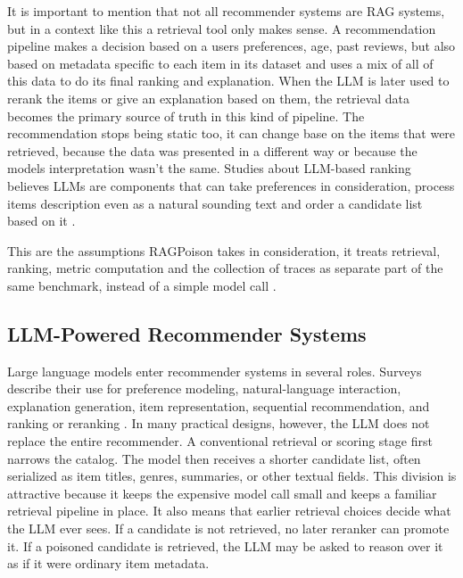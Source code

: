 It is important to mention that not all recommender systems are RAG systems, but in a context like this a retrieval tool only makes sense. A recommendation pipeline makes a decision based on a users preferences, age, past reviews, but also based on metadata specific to each item in its dataset and uses a mix of all of this data to do its final ranking and explanation. When the LLM is later used to rerank the items or give an explanation based on them, the retrieval data becomes the primary source of truth in this kind of pipeline. The recommendation stops being static too, it can change base on the items that were retrieved, because the data was presented in a different way or because the models interpretation wasn't the same. Studies about LLM-based ranking believes LLMs are components that can take preferences in consideration, process items description even as a natural sounding text and order a candidate list based on it \cite{wu2024llmrecsurvey,zhao2024llmrecsystems,hou2024llmrankers,sun2024rankgpt}.

This are the assumptions RAGPoison takes in consideration, it treats retrieval, ranking, metric computation and the collection of traces as separate part of the same benchmark, instead of a simple model call \cite{ragpoisonlab_repo}. 

\subsection{LLM-Powered Recommender Systems}

Large language models enter recommender systems in several roles. Surveys describe their use for preference modeling, natural-language interaction, explanation generation, item representation, sequential recommendation, and ranking or reranking \cite{wu2024llmrecsurvey,zhao2024llmrecsystems}. In many practical designs, however, the LLM does not replace the entire recommender. A conventional retrieval or scoring stage first narrows the catalog. The model then receives a shorter candidate list, often serialized as item titles, genres, summaries, or other textual fields. This division is attractive because it keeps the expensive model call small and keeps a familiar retrieval pipeline in place. It also means that earlier retrieval choices decide what the LLM ever sees. If a candidate is not retrieved, no later reranker can promote it. If a poisoned candidate is retrieved, the LLM may be asked to reason over it as if it were ordinary item metadata.

